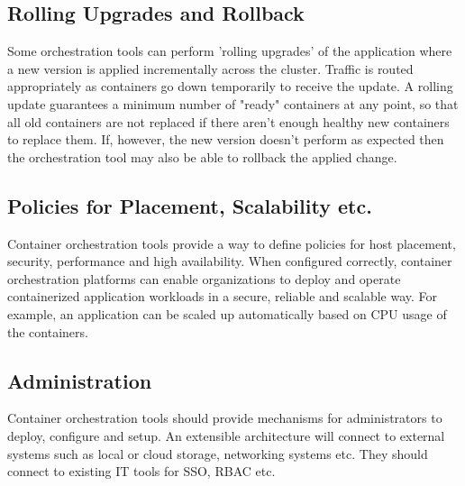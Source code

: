 \documentclass[sigconf]{acmart}
\begin{document}
	\subsection{Rolling Upgrades and Rollback }
	Some orchestration tools can perform 'rolling upgrades' of the application where a new version is applied incrementally
	across the cluster. Traffic is routed appropriately as containers go down temporarily to receive the update. A rolling update
	guarantees a minimum number of "ready" containers at any point, so that all old containers are not replaced if there aren't
	enough healthy new containers to replace them. If, however, the new version doesn't perform as expected then the
	orchestration tool may also be able to rollback the applied change. 
	\subsection{Policies for Placement, Scalability etc.}	
	Container orchestration tools provide a way to define policies for host placement, security, performance and high availability.
	When configured correctly, container orchestration platforms can enable organizations to deploy and operate containerized
	application workloads in a secure, reliable and scalable way. For example, an application can be scaled up automatically based
	on CPU usage of the containers. 
	\subsection{Administration}	
	Container orchestration tools should provide mechanisms for administrators to deploy, configure and setup. An extensible
	architecture will connect to external systems such as local or cloud storage, networking systems etc. They should connect to
	existing IT tools for SSO, RBAC etc. 
	
\end{document}
